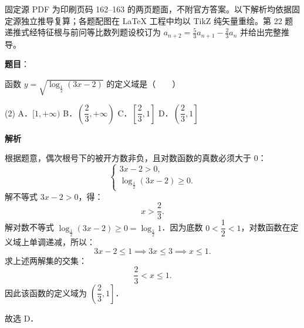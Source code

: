 

\begin{gktip}
固定源 PDF 为印刷页码 162–163 的两页题面，不附官方答案。以下解析均依据固定源独立推导复算；各题配图在 LaTeX 工程中均以 TikZ 纯矢量重绘。第 22 题递推式经特征根与前问等比数列题设校订为 $a_{n+2} = \frac{5}{3}a_{n+1} - \frac{2}{3}a_n$ 并给出完整推导。
\end{gktip}

\begin{answer}

\textbf{题目}：

函数 $y = \sqrt{\log_{\frac{1}{2}}(3x - 2)}$ 的定义域是\mbox{（　　）}

\begin{gkopts}(2)
\task A．$[1, +\infty)$
\task B．$\left(\dfrac{2}{3}, +\infty\right)$
\task C．$\left[\dfrac{2}{3}, 1\right]$
\task D．$\left(\dfrac{2}{3}, 1\right]$
\end{gkopts}

\textbf{解析}

根据题意，偶次根号下的被开方数非负，且对数函数的真数必须大于 $0$：
\nopagebreak[4]
\[
\begin{cases}
3x - 2 > 0, \\
\log_{\frac{1}{2}}(3x - 2) \geqslant 0.
\end{cases}
\]
解不等式 $3x - 2 > 0$，得：
\nopagebreak[4]
\[
x > \frac{2}{3}.
\]
解对数不等式 $\log_{\frac{1}{2}}(3x - 2) \geqslant 0 = \log_{\frac{1}{2}} 1$．因为底数 $0 < \dfrac{1}{2} < 1$，对数函数在定义域上单调递减，所以：
\nopagebreak[4]
\[
3x - 2 \leqslant 1 \implies 3x \leqslant 3 \implies x \leqslant 1.
\]
求上述两解集的交集：
\nopagebreak[4]
\[
\frac{2}{3} < x \leqslant 1.
\]
因此该函数的定义域为 $\left(\dfrac{2}{3}, 1\right]$．

故选 D．


\end{answer}
